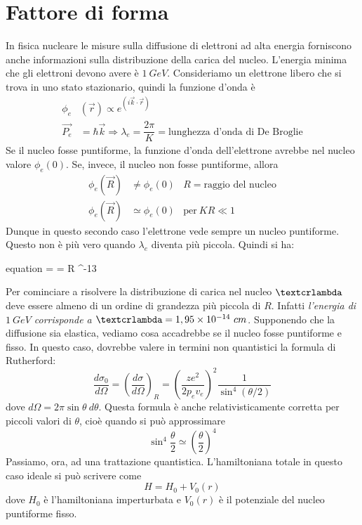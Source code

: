 \chapter{Fattore di forma}
In fisica nucleare  le misure sulla diffusione di
elettroni ad alta energia forniscono anche informazioni sulla distribuzione
della carica del nucleo. L'energia minima che gli elettroni devono avere è $1 \
GeV$. Consideriamo un elettrone libero che si trova in uno stato stazionario,
quindi la funzione d'onda è
\begin{align}
\phi _{e} &(\vec{r}) \propto e^{(i\vec{k} \cdot \vec{r})} \\
\vec{P_{e}} &= \hbar \vec{k} \Rightarrow \lambda _{e} = \dfrac{2\pi}{K} = 
\text{lunghezza d'onda di De Broglie}
\end{align} 
Se il nucleo fosse puntiforme, la funzione d'onda dell'elettrone avrebbe nel
nucleo valore $\phi _{e} (0)$. Se, invece, il nucleo non fosse puntiforme,
allora
\begin{align}
\phi _{e} (\vec{R}) & \neq \phi _{e}(0)  & R = \text{raggio del nucleo} \\
\phi _{e} (\vec{R}) & \simeq \phi _{e}(0) & \text{per} \ KR \ll 1
\end{align}
Dunque in questo secondo caso l'elettrone vede sempre un nucleo puntiforme.
Questo non è più vero quando $\lambda _{e}$ diventa più piccola. Quindi si 
ha:
\begin{empheq} [box=%
\fbox]{equation}
\text{\textcrlambda} =  =  \gg R \simeq
10^{-13} \ \text{cm} \Rightarrow \text{nucleo puntiforme}
\end{empheq}
Per cominciare a risolvere la distribuzione di carica nel nucleo
$\text{\textcrlambda}$ deve essere almeno di un ordine di grandezza più piccola
di $R$. Infatti \textit{l'energia di $1 \ GeV$ corrisponde a
  $\text{\textcrlambda} = 1,95 \times 10^{-14} \ cm$}. Supponendo che la
  diffusione sia elastica, vediamo cosa accadrebbe se il nucleo fosse puntiforme
  e fisso. In questo caso, dovrebbe valere in termini non quantistici la formula
  di Rutherford:
\begin{equation}
\dfrac{d\sigma _0}{d\Omega} = \left(\dfrac{d\sigma}{d\Omega}\right) _R = \left( 
\dfrac{ze^2}{2p_ev_e} \right) ^2 \dfrac{1}{\sin ^{4}(\theta /2)} 
\end{equation}
dove $d\Omega = 2 \pi \sin \theta \ d\theta$.
Questa formula è anche relativisticamente corretta per piccoli valori di
$\theta$, cioè quando si può approssimare
\begin{equation}
\sin ^{4} \dfrac{\theta}{2} \simeq \left(\dfrac{\theta}{2}\right)^{4}
\end{equation}
Passiamo, ora, ad una trattazione quantistica. L'hamiltoniana totale in questo
caso ideale si può scrivere come
\begin{equation}
H = H_{0} + V_{0}(r)
\end{equation}
dove $H_{0}$ è l'hamiltoniana imperturbata e $V_{0}(r)$ è il potenziale del
nucleo puntiforme fisso.

